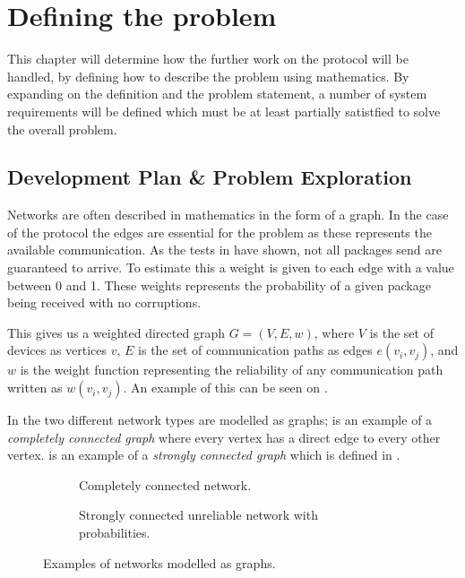 \chapter{Defining the problem}
This chapter will determine how the further work on the protocol will be handled, by defining how to describe the problem using mathematics. 
By expanding on the definition and the problem statement, a number of system requirements will be defined which must be at least partially satistfied to solve the overall problem.


\section{Development Plan \& Problem Exploration}\label{chp:Problems}
Networks are often described in mathematics in the form of a graph. 
In the case of the protocol the edges are essential for the problem as these represents the available communication.
As the tests in  have shown, not all packages send are guaranteed to arrive.
To estimate this a weight is given to each edge with a value between 0 and 1.
These weights represents the probability of a given package being received with no corruptions.

This gives us a weighted directed graph $G = (V, E, w)$, where $V$ is the set of devices as vertices $v$, $E$ is the set of communication paths as edges $e(v_i, v_j)$, and $w$ is the weight function representing the reliability of any communication path written as $w(v_i,v_j)$.
An example of this can be seen on .

In  the two different network types are modelled as graphs; 
 is an example of a \emph{completely connected graph} where every vertex has a direct edge to every other vertex.
 is an example of a \emph{strongly connected graph} which is defined in .

\begin{figure}[h]
    \begin{subfigure}{0.5\linewidth}
        \centering
        
        \caption{Completely connected network.}
        \label{fig:ccrcnetworkgraph}
    \end{subfigure}\hfill
    \begin{subfigure}{0.5\linewidth}
        \centering
        
        \caption{Strongly connected unreliable network with probabilities.}
        \label{fig:network}
    \end{subfigure}
    \caption{Examples of networks modelled as graphs.}
    \label{fig:examplenetworkgraphs} 
\end{figure}


